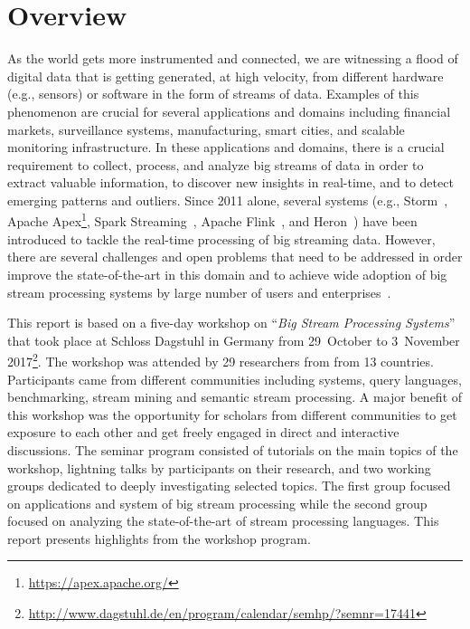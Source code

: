 \section{Overview}\label{sec:overview}

As the world gets more instrumented and connected, we are witnessing a
flood of digital data that is getting generated, at high velocity,
from different hardware (e.g., sensors) or software in the form of
streams of data. Examples of this phenomenon are crucial for several
applications and domains including financial markets, surveillance
systems, manufacturing, smart cities, and scalable monitoring
infrastructure. In these applications and domains, there is a crucial
requirement to collect, process, and analyze big streams of data in
order to extract valuable information, to discover new insights in
real-time, and to detect emerging patterns and outliers. Since 2011
alone, several systems (e.g.,
Storm~\cite{toshniwal_et_al_2014},
Apache Apex\footnote{\url{https://apex.apache.org/}},
Spark Streaming~\cite{zaharia_et_al_2013},
Apache Flink~\cite{carbone_et_al_2015}, and
Heron~\cite{kulkarni_et_al_2015}) have
been introduced to tackle the real-time processing of big streaming
data. However, there are several challenges and open problems that
need to be addressed in order improve the state-of-the-art in this
domain and to achieve wide adoption of big stream processing systems
by large number of users and enterprises~\cite{sakr2016big}.

This report is based on a five-day workshop on ``\emph{Big Stream
  Processing Systems}'' that took place at Schloss Dagstuhl in Germany
from 29~October to 3~November 2017\footnote{\url{http://www.dagstuhl.de/en/program/calendar/semhp/?semnr=17441}}. The workshop was attended by 29
researchers from from 13 countries. Participants came from different
communities including systems, query languages, benchmarking, stream
mining and semantic stream processing. A major benefit of this
workshop was the opportunity for scholars from different communities
to get exposure to each other and get freely engaged in direct and
interactive discussions. The seminar program consisted of tutorials on
the main topics of the workshop, lightning talks by participants on
their research, and two working groups dedicated to deeply
investigating selected topics. The first group focused on applications
and system of big stream processing while the second group focused on
analyzing the state-of-the-art of stream processing languages. This
report presents highlights from the workshop program.
